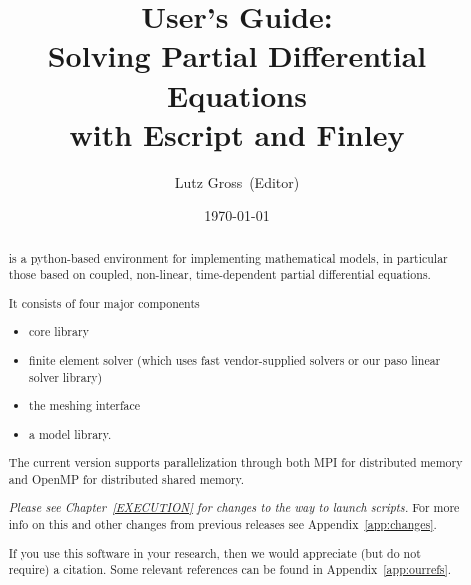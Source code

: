 \documentclass{esysdoc}
\title{\module{esys} User's Guide:\\ Solving Partial Differential Equations\\ with Escript and Finley}
\author{Lutz Gross\etal~(Editor)}
\date{\today}
\begin{document}
\maketitle

\ifpdf
{}
\fi



\begin{abstract}
\escript is a python-based environment for implementing mathematical models, in particular those based on coupled, non-linear, time-dependent partial differential equations.

It consists of four major components
\begin{itemize}
\item \escript core library
\item finite element solver \finley (which uses fast vendor-supplied solvers or our paso linear solver library)
\item the meshing interface \pycad
\item a model library.
\end{itemize}
The current version supports parallelization through both MPI for distributed memory and OpenMP for distributed shared memory.

\emph{Please see Chapter~\ref{EXECUTION} for changes to the way to launch \escript scripts.}
For more info on this and other changes from previous releases see Appendix~\ref{app:changes}.

If you use this software in your research, then we would appreciate (but do not require) a citation.
Some relevant references can be found in Appendix~\ref{app:ourrefs}.
\end{abstract}

\tableofcontents








\appendix

%





\end{document}
